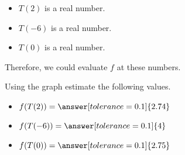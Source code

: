 \documentclass{ximera}
\begin{document}
\begin{itemize}
\item $T(2)$ is a real number.  
\item $T(-6)$ is a real number. 
\item $T(0)$ is a real number.  
\end{itemize}


Therefore, we could evaluate $f$ at these numbers.


\begin{question}


Using the graph estimate the following values.


\begin{itemize}

\item $f(T(2)) = \answer[tolerance=0.1]{2.74}$ \\

\item $f(T(-6)) = \answer[tolerance=0.1]{4}$ \\

\item $f(T(0)) = \answer[tolerance=0.1]{2.75}$ \\

\end{itemize}


\end{question}
\end{document}
